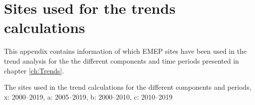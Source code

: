 \setcounter{page}{1}

\cleardoublepage
\chapter[Trends 2000--2019]{Sites used for the trends calculations}
\label{ch:appx_trends}
This appendix contains information of which EMEP sites have been used in the trend analysis for the the different components and time periods presented in chapter \ref{ch:Trends}. 

\clearpage

\begin{table}
\caption{\label{tab:sites_trend} The sites used in the trend calculations for the different components and periods, x: 2000--2019, a: 2005--2019, b: 2000--2010, c: 2010--2019}
\centering{
\scalebox{0.65}{%

}}
\end{table}
